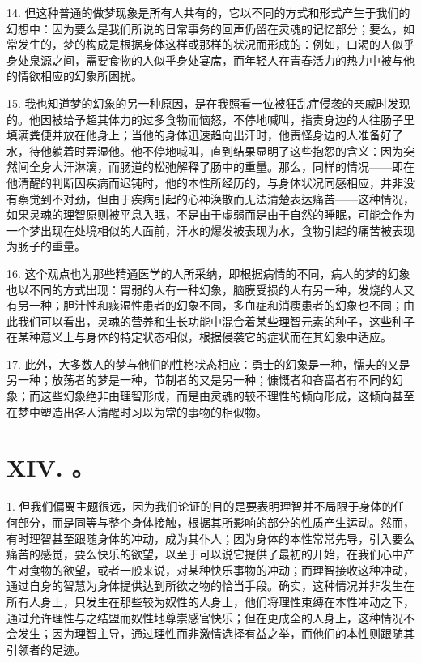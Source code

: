 14. 但这种普通的做梦现象是所有人共有的，它以不同的方式和形式产生于我们的幻想中：因为要么是我们所说的日常事务的回声仍留在灵魂的记忆部分；要么，如常发生的，梦的构成是根据身体这样或那样的状况而形成的：例如，口渴的人似乎身处泉源之间，需要食物的人似乎身处宴席，而年轻人在青春活力的热力中被与他的情欲相应的幻象所困扰。\par

15. 我也知道梦的幻象的另一种原因，是在我照看一位被狂乱症侵袭的亲戚时发现的。他因被给予超其体力的过多食物而恼怒，不停地喊叫，指责身边的人往肠子里填满粪便并放在他身上；当他的身体迅速趋向出汗时，他责怪身边的人准备好了水，待他躺着时弄湿他。他不停地喊叫，直到结果显明了这些抱怨的含义：因为突然间全身大汗淋漓，而肠道的松弛解释了肠中的重量。那么，同样的情况——即在他清醒的判断因疾病而迟钝时，他的本性所经历的，与身体状况同感相应，并非没有察觉到不对劲，但由于疾病引起的心神涣散而无法清楚表达痛苦——这种情况，如果灵魂的理智原则被平息入眠，不是由于虚弱而是由于自然的睡眠，可能会作为一个梦出现在处境相似的人面前，汗水的爆发被表现为水，食物引起的痛苦被表现为肠子的重量。\par

16. 这个观点也为那些精通医学的人所采纳，即根据病情的不同，病人的梦的幻象也以不同的方式出现：胃弱的人有一种幻象，脑膜受损的人有另一种，发烧的人又有另一种；胆汁性和痰湿性患者的幻象不同，多血症和消瘦患者的幻象也不同；由此我们可以看出，灵魂的营养和生长功能中混合着某些理智元素的种子，这些种子在某种意义上与身体的特定状态相似，根据侵袭它的症状而在其幻象中适应。\par

17. 此外，大多数人的梦与他们的性格状态相应：勇士的幻象是一种，懦夫的又是另一种；放荡者的梦是一种，节制者的又是另一种；慷慨者和吝啬者有不同的幻象；而这些幻象绝非由理智形成，而是由灵魂的较不理性的倾向形成，这倾向甚至在梦中塑造出各人清醒时习以为常的事物的相似物。\par


\section{XIV. 。}

1. 但我们偏离主题很远，因为我们论证的目的是要表明理智并不局限于身体的任何部分，而是同等与整个身体接触，根据其所影响的部分的性质产生运动。然而，有时理智甚至跟随身体的冲动，成为其仆人；因为身体的本性常常先导，引入要么痛苦的感觉，要么快乐的欲望，以至于可以说它提供了最初的开始，在我们心中产生对食物的欲望，或者一般来说，对某种快乐事物的冲动；而理智接收这种冲动，通过自身的智慧为身体提供达到所欲之物的恰当手段。确实，这种情况并非发生在所有人身上，只发生在那些较为奴性的人身上，他们将理性束缚在本性冲动之下，通过允许理性与之结盟而奴性地尊崇感官快乐；但在更成全的人身上，这种情况不会发生；因为理智主导，通过理性而非激情选择有益之举，而他们的本性则跟随其引领者的足迹。\par

